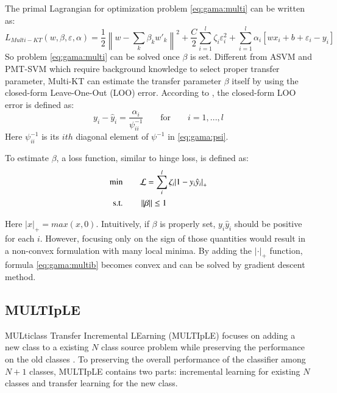 The primal Lagrangian for optimization problem \eqref{eq:gama:multi} can be written as:
\begin{equation}
{L_{Multi - KT}}\left( {w,\beta ,\varepsilon ,\alpha } \right) = \frac{1}{2}{\left\| {w - \sum\limits_k {{\beta _k}} {{w'}_k}} \right\|^2} + \frac{C}{2}\sum\limits_{i = 1}^l {{\zeta _i}\varepsilon _i^2}  + \sum\limits_{i = 1}^l {{\alpha _i}\left[ {w{x_i} + b + {\varepsilon _i} - {y_i}} \right]} 
\end{equation}
So problem \eqref{eq:gama:multi} can be solved once $\beta$ is set.
Different from ASVM and PMT-SVM which require background knowledge to select proper transfer parameter, Multi-KT can estimate the transfer parameter $\beta$ itself by using the closed-form Leave-One-Out (LOO) error. According to \cite{cawley2006leave}, the closed-form LOO error is defined as:
\begin{equation}\label{eq:gama:loo}
{y_{i}} - {\hat y_{i}} = \frac{{{\alpha _{i}}}}{{\psi_{ii}^{ - 1}}}{\qquad\text{for}}\qquad i = 1,...,l
\end{equation}
Here $\psi_{ii}^{-1}$ is its $ith$ diagonal element of $\psi^{-1}$ in \eqref{eq:gama:psi}.

To estimate $\beta$, a loss function, similar to hinge loss, is defined as: 
\begin{equation}\label{eq:gama:multib}
\begin{aligned}
\text{min} \qquad&{\cal L} = \sum\limits_i^l {{\zeta _i}{{\left| {1 - {y_i}{{\hat y}_i}} \right|}_ + }} \\
\text{s.t.} \qquad& \left\| \beta  \right\| \le 1
\end{aligned}
\end{equation}

Here $|x|_+=max(x,0)$. Intuitively, if $\beta$ is properly set, ${y_i}{{\hat y}_i}$ should be positive for each $i$. However, focusing only on the sign of those quantities would result in a non-convex formulation with many local minima. By adding the $|\cdot|_+$ function, formula \eqref{eq:gama:multib} becomes convex and can be solved by gradient descent method.

\subsection{MULTIpLE}
MULticlass Transfer Incremental LEarning (MULTIpLE) focuses on adding a new class to a existing $N$ class source problem while preserving the performance on the old classes \cite{kuzborskij2013n}. To preserving the overall performance of the classifier among $N+1$ classes, MULTIpLE contains two parts: incremental learning for existing $N$ classes and transfer learning for the new class.

